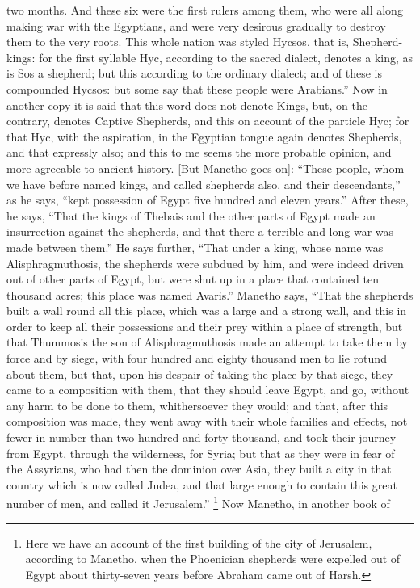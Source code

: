 two months. And these six were the first rulers among them, who were all
along making war with the Egyptians, and were very desirous gradually to
destroy them to the very roots. This whole nation was styled Hycsos, that
is, Shepherd-kings: for the first syllable Hyc, according to the sacred
dialect, denotes a king, as is Sos a shepherd; but this according to the
ordinary dialect; and of these is compounded Hycsos: but some say that
these people were Arabians.'' Now in another copy it is said that this word
does not denote Kings, but, on the contrary, denotes Captive Shepherds,
and this on account of the particle Hyc; for that Hyc, with the
aspiration, in the Egyptian tongue again denotes Shepherds, and that
expressly also; and this to me seems the more probable opinion, and more
agreeable to ancient history. [But Manetho goes on]: ``These people, whom
we have before named kings, and called shepherds also, and their
descendants,'' as he says, ``kept possession of Egypt five hundred and
eleven years.'' After these, he says, ``That the kings of Thebais and the
other parts of Egypt made an insurrection against the shepherds, and that
there a terrible and long war was made between them.'' He says further,
``That under a king, whose name was Alisphragmuthosis, the shepherds were
subdued by him, and were indeed driven out of other parts of Egypt, but
were shut up in a place that contained ten thousand acres; this place was
named Avaris.'' Manetho says, ``That the shepherds built a wall round all
this place, which was a large and a strong wall, and this in order to keep
all their possessions and their prey within a place of strength, but that
Thummosis the son of Alisphragmuthosis made an attempt to take them by
force and by siege, with four hundred and eighty thousand men to lie
rotund about them, but that, upon his despair of taking the place by that
siege, they came to a composition with them, that they should leave Egypt,
and go, without any harm to be done to them, whithersoever they would; and
that, after this composition was made, they went away with their whole
families and effects, not fewer in number than two hundred and forty
thousand, and took their journey from Egypt, through the wilderness, for
Syria; but that as they were in fear of the Assyrians, who had then the
dominion over Asia, they built a city in that country which is now called
Judea, and that large enough to contain this great number of men, and
called it Jerusalem.'' \footnote{Here we have an account of
the first building of the city of Jerusalem, according to Manetho, when
the Phoenician shepherds were expelled out of Egypt about thirty-seven
years before Abraham came out of Harsh.} Now Manetho, in another book of
